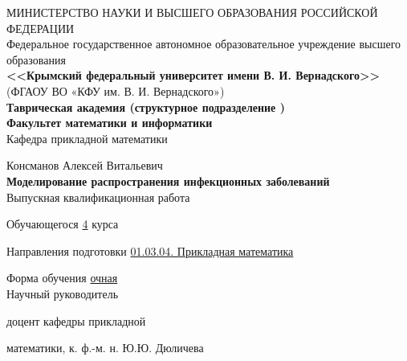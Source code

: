     \begin{titlepage}
    \newpage
	\pagestyle{empty} %
    \begin{center}
    
	
	{\fontsize{13}{15.6}\selectfont МИНИСТЕРСТВО НАУКИ И ВЫСШЕГО ОБРАЗОВАНИЯ 
		РОССИЙСКОЙ ФЕДЕРАЦИИ}\\ 
    \normalsize  {Федеральное государственное автономное образовательное учреждение высшего образования} \\
    
    \large \textbf{<<Крымский  федеральный  университет имени В. И. Вернадского>>} \\  \vspace{2mm}
    (ФГАОУ ВО «КФУ им. В. И. Вернадского»)\\
    
    \textbf{Таврическая академия (структурное подразделение ) \\
    \vspace{2mm}
    Факультет математики и информатики} \\
    \vspace{2mm}
    Кафедра прикладной математики 
    \end{center}
    \vspace{1em}

    \begin{center}
	\normalsize Консманов Алексей Витальевич \\
    \LARGE \textbf{Моделирование распространения инфекционных заболеваний} \\
    \vspace{1em}
    \normalsize Выпускная квалификационная работа 
    \end{center}

    \vspace{1em}
    Обучающегося \hspace*{3cm} \underline{4} курса 
    
    
    Направления подготовки\hspace*{8mm} \underline{01.03.04. Прикладная математика}
    
        
    Форма обучения\hspace*{2.75cm} \underline{очная}\\
    
    
    Научный руководитель
    
    доцент кафедры прикладной  
    
   математики, к. ф.-м. н. \hspace*{5cm} Ю.Ю. Дюличева
   

\end{titlepage}
